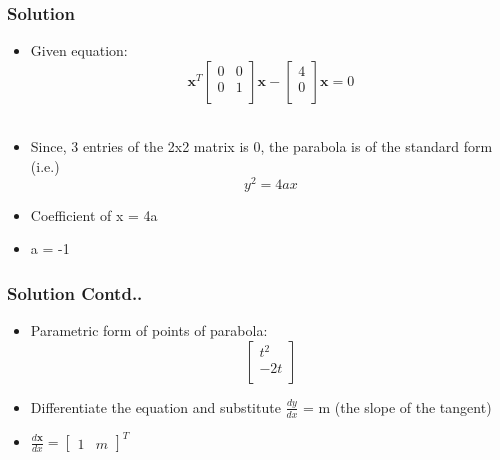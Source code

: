 \documentclass[12pt]{beamer}
\begin{document}
\begin{frame}
\frametitle{Solution}
\begin{itemize}
\item<1-4> Given equation:
\[
\textbf{x}^T
\begin{bmatrix}
    0 & 0\\
    0 & 1\\  
\end{bmatrix}
\textbf{x}  -  
\begin{bmatrix}
    4\\
    0\\  
\end{bmatrix}
\textbf{x} = 0
\] \\
\item<2-4> Since, 3 entries of the 2x2 matrix is 0, the parabola is of the standard form (i.e.) \[ y^2 = 4ax\]
\item<3-4> Coefficient of x = 4a
\item<4> a = -1
\end{itemize}
\end{frame}


\begin{frame}
\frametitle{Solution Contd..}
\begin{itemize}
\item<1-3> Parametric form of points of parabola: 
\[
\begin{bmatrix}
    t^2\\
    -2t\\  
\end{bmatrix}
\]
\item<2-3> Differentiate the equation and substitute $\frac{dy}{dx}$ = m (the slope of the tangent)
\item<3> $\frac{d\textbf{x}}{dx} = 
\begin{bmatrix}
    1 & m
\end{bmatrix}^T$
\end{itemize}
\end{frame}

\end{document}
